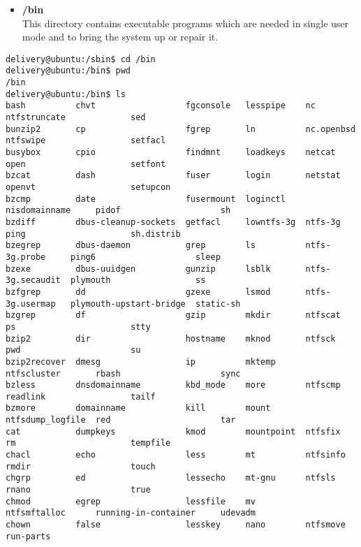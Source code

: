 \documentclass[a4paper,11pt,spanish]{article} %
\newenvironment{mytinylisting}
{\begin{list}{}{\setlength{\leftmargin}{1em}}\item\tiny\bfseries}
{\end{list}}
\begin{document}
\begin{itemize}
 \item \textbf{/bin}\\
    This directory contains executable programs which are needed
    in single user mode and to bring the system up or repair it.
\end{itemize}

\begin{mytinylisting}
 \begin{verbatim}
delivery@ubuntu:/sbin$ cd /bin
delivery@ubuntu:/bin$ pwd
/bin
delivery@ubuntu:/bin$ ls
bash          chvt                  fgconsole   lesspipe    nc                ntfstruncate             sed     
bunzip2       cp                    fgrep       ln          nc.openbsd        ntfswipe                 setfacl          
busybox       cpio                  findmnt     loadkeys    netcat            open                     setfont          
bzcat         dash                  fuser       login       netstat           openvt                   setupcon         
bzcmp         date                  fusermount  loginctl    nisdomainname     pidof                    sh               
bzdiff        dbus-cleanup-sockets  getfacl     lowntfs-3g  ntfs-3g           ping                     sh.distrib       
bzegrep       dbus-daemon           grep        ls          ntfs-3g.probe     ping6                    sleep            
bzexe         dbus-uuidgen          gunzip      lsblk       ntfs-3g.secaudit  plymouth                 ss               
bzfgrep       dd                    gzexe       lsmod       ntfs-3g.usermap   plymouth-upstart-bridge  static-sh        
bzgrep        df                    gzip        mkdir       ntfscat           ps                       stty             
bzip2         dir                   hostname    mknod       ntfsck            pwd                      su               
bzip2recover  dmesg                 ip          mktemp      ntfscluster       rbash                    sync             
bzless        dnsdomainname         kbd_mode    more        ntfscmp           readlink                 tailf            
bzmore        domainname            kill        mount       ntfsdump_logfile  red                      tar              
cat           dumpkeys              kmod        mountpoint  ntfsfix           rm                       tempfile         
chacl         echo                  less        mt          ntfsinfo          rmdir                    touch            
chgrp         ed                    lessecho    mt-gnu      ntfsls            rnano                    true             
chmod         egrep                 lessfile    mv          ntfsmftalloc      running-in-container     udevadm          
chown         false                 lesskey     nano        ntfsmove          run-parts       
 \end{verbatim}
\end{mytinylisting}    
\end{document}

